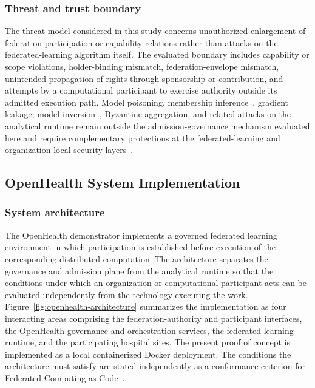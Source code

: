 \documentclass[twoside,11pt]{article}
\begin{document}
\subsubsection{Threat and trust boundary}
The threat model considered in this study concerns unauthorized enlargement of federation participation or capability relations rather than attacks on the federated-learning algorithm itself. The evaluated boundary   includes capability or scope violations, holder-binding mismatch, federation-envelope mismatch, unintended propagation of rights through sponsorship or contribution, and attempts by a computational participant to exercise authority outside its admitted execution path. Model poisoning, membership inference~\cite{Shokri_2017}, gradient leakage, model inversion~\cite{Fredrikson_2015}, Byzantine aggregation, and related attacks on the analytical runtime remain outside the admission-governance mechanism evaluated here and require complementary protections at the federated-learning and organization-local security layers~\cite{kairouz_2021}.


\subsection{OpenHealth System Implementation}
\label{ssec:implementtaion}

\subsubsection{System architecture}
The OpenHealth demonstrator implements a governed federated learning environment in which participation is established before execution of the corresponding distributed computation. The architecture separates the governance and admission plane from the analytical runtime so that the conditions under which an organization or computational participant acts can be evaluated independently from the technology executing the work. Figure~\ref{fig:openhealth-architecture} summarizes the implementation as four interacting areas comprising the federation-authority and participant interfaces, the OpenHealth governance and orchestration services, the federated learning runtime, and the participating hospital sites. The present proof of concept is implemented as a local containerized Docker deployment. The conditions the architecture must satisfy are stated independently as a conformance criterion for Federated Computing as Code~\cite{fenoglio_2026_criterion}.
\end{document}
